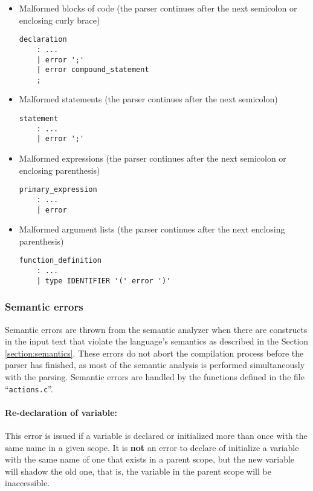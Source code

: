 \begin{itemize}
\item  Malformed blocks of code (the parser continues after the next semicolon or enclosing
curly brace)
\begin{lstlisting}
declaration
	: ...
	| error ';'
	| error compound_statement
	;

\end{lstlisting}

\item  Malformed statements (the parser continues after the next semicolon)
\begin{lstlisting}
statement
	: ...
	| error ';'
\end{lstlisting}

\item  Malformed expressions (the parser continues after the next semicolon or enclosing
parenthesis)
\begin{lstlisting}
primary_expression
	: ...
	| error
\end{lstlisting}

\item  Malformed argument lists (the parser continues after the next enclosing parenthesis)
\begin{lstlisting}
function_definition
	: ...
	| type IDENTIFIER '(' error ')'
\end{lstlisting}
\end{itemize}


\subsubsection{Semantic errors}
Semantic errors are thrown from the semantic analyzer when there are constructs
in the input text that violate the language's semantics as described in the Section
\ref{section:semantics}. These errors do not abort the compilation process before
the parser has finished, as most of the semantic analysis is performed
simultaneously with the parsing. Semantic errors are handled by the functions
defined in the file ``\texttt{actions.c}''.

\paragraph{Re-declaration of variable:} This error is issued if a variable is
declared or initialized more than once with the same name in a given scope.
It is \textbf{not} an error to declare of initialize a variable with the same
name of one that exists in a parent scope, but the new variable will shadow the
old one, that is, the variable in the parent scope will be inaccessible. %

